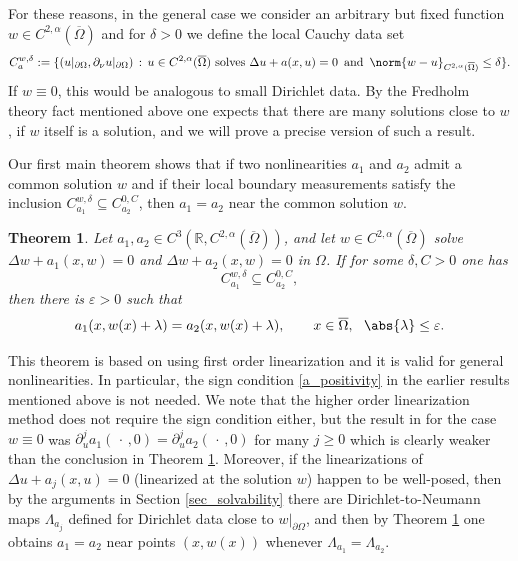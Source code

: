 \documentclass[11pt,a4paper]{amsart}
\newtheorem{Theorem}{Theorem}[section]
\theoremstyle{definition}
\numberwithin{equation}{section}
\newcommand{\mR}{\mathbb{R}}                    %
\newcommand{\ol}[1]{\overline{#1}}
\newcommand{\eps}{\varepsilon}
\newcommand{\p}{\partial}
\newcommand{\Om}{\Omega}
\begin{document}
For these reasons, in the general case we consider an arbitrary but fixed function $w \in C^{2,\alpha}(\ol{\Om})$ and for $\delta > 0$ we define the local Cauchy data set 
\begin{equation*}
    C_{a}^{w,\delta} := \{ (u|_{\p \Omega}, \p_{\nu} u|_{\p \Omega}) \,:\, u \in C^{2,\alpha}(\ol{\Omega}) \text{ solves $\Delta u + a(x,u) = 0$}\, \text{ and }\, \norm{w-u}_{C^{2,\alpha}(\ol{\Om})}\leq \delta\}.
\end{equation*}
If $w \equiv 0$, this would be analogous to small Dirichlet data. By the Fredholm theory fact mentioned above one expects that there are many solutions close to $w$, if \( w \) itself is a solution, and we will prove a precise version of such a result.

Our first main theorem shows that if two nonlinearities $a_1$ and $a_2$ admit a common solution $w$ and if their local boundary measurements satisfy the inclusion $C_{a_1}^{w,\delta} \subseteq C_{a_2}^{0,C}$, then $a_1 = a_2$ near the common solution $w$.

\begin{Theorem} \label{thm_main0}
Let $a_1, a_2 \in C^3(\mR, C^{2,\alpha}(\ol{\Om}))$, and let $w \in C^{2,\alpha}(\ol{\Om})$ solve $\Delta w + a_1(x,w) = 0$ and $\Delta w + a_2(x,w) = 0$ in $\Om$. If for some $\delta, C > 0$ one has 
\[
C_{a_1}^{w,\delta} \subseteq C_{a_2}^{0,C},
\]
then there is $\eps > 0$  such that 
\[
a_1(x,w(x)+\lambda) = a_2(x,w(x)+\lambda), \qquad x \in \ol{\Om}, \ \ \abs{\lambda} \leq \eps.
\]
\end{Theorem}

This theorem is based on using first order linearization and it is valid for general nonlinearities. In particular, the sign condition \eqref{a_positivity} in the earlier results mentioned above is not needed. We note that the higher order linearization method does not require the sign condition either, but the result in \cites{FO, LLLS} for the case $w \equiv 0$ was $\p_u^j a_1(\,\cdot\,,0) = \p_u^j a_2(\,\cdot\,,0)$ for many $j \geq 0$ which is clearly weaker than the conclusion in Theorem \ref{thm_main0}. Moreover, if the linearizations of $\Delta u + a_j(x,u) = 0$ (linearized at the solution $w$) happen to be well-posed, then by the arguments in Section \ref{sec_solvability} there are Dirichlet-to-Neumann maps $\Lambda_{a_j}$ defined for Dirichlet data close to $w|_{\p \Om}$, and then by Theorem \ref{thm_main0} one obtains $a_1=a_2$ near points $(x,w(x))$ whenever $\Lambda_{a_1} = \Lambda_{a_2}$.
\end{document}
